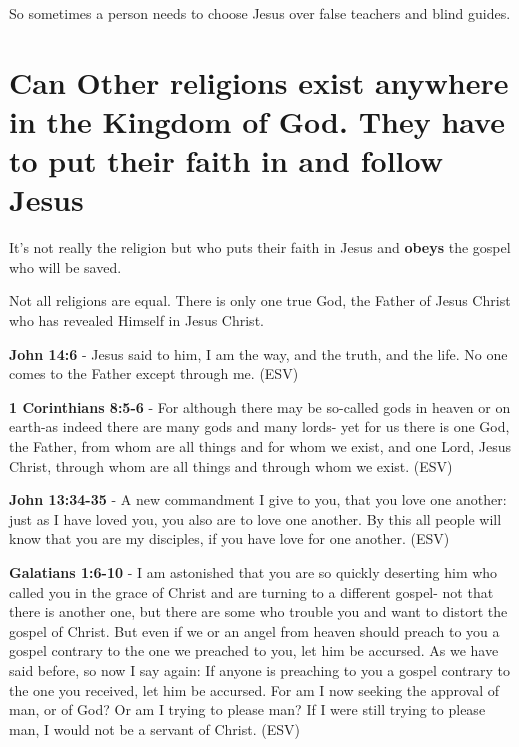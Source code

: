 \documentclass[11pt]{article}
\begin{document}
So sometimes a person needs to choose Jesus over false teachers and blind guides.

\section{Can Other religions exist anywhere in the Kingdom of God. They have to put their faith in and follow Jesus}
\label{sec:orgc81dd81}
It's not really the religion but who puts their faith in Jesus and \textbf{obeys} the gospel who will be saved.

Not all religions are equal.
There is only one true God, the Father of Jesus Christ who has revealed Himself in Jesus Christ.

\textbf{John 14:6} - Jesus said to him, I am the way, and the truth, and the life. No one comes to the Father except through me. (ESV)

\textbf{1 Corinthians 8:5-6} - For although there may be so-called gods in heaven or on earth-as indeed there are many gods and many lords- yet for us there is one God, the Father, from whom are all things and for whom we exist, and one Lord, Jesus Christ, through whom are all things and through whom we exist. (ESV)

\textbf{John 13:34-35} - A new commandment I give to you, that you love one another: just as I have loved you, you also are to love one another. By this all people will know that you are my disciples, if you have love for one another. (ESV)

\textbf{Galatians 1:6-10} - I am astonished that you are so quickly deserting him who called you in the grace of Christ and are turning to a different gospel- not that there is another one, but there are some who trouble you and want to distort the gospel of Christ. But even if we or an angel from heaven should preach to you a gospel contrary to the one we preached to you, let him be accursed. As we have said before, so now I say again: If anyone is preaching to you a gospel contrary to the one you received, let him be accursed. For am I now seeking the approval of man, or of God? Or am I trying to please man? If I were still trying to please man, I would not be a servant of Christ. (ESV)
\end{document}
